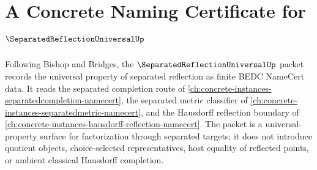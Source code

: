 \chapter{A Concrete Naming Certificate for $\SeparatedReflectionUniversalUp$}
\label{ch:concrete-instances-separated-reflection-universal-namecert}

Following Bishop and Bridges, the $\SeparatedReflectionUniversalUp$ packet records the universal property of separated reflection as finite BEDC NameCert data. It reads the separated completion route of \autoref{ch:concrete-instances-separatedcompletion-namecert}, the separated metric classifier of \autoref{ch:concrete-instances-separatedmetric-namecert}, and the Hausdorff reflection boundary of \autoref{ch:concrete-instances-hausdorff-reflection-namecert}. The packet is a universal-property surface for factorization through separated targets; it does not introduce quotient objects, choice-selected representatives, host equality of reflected points, or ambient classical Hausdorff completion.

